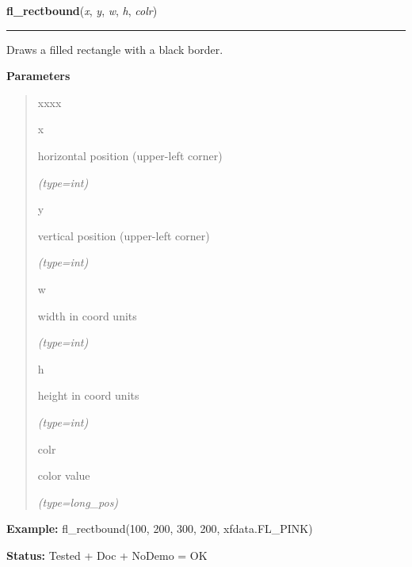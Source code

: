     \label{xformslib:flxbasic:fl_rectbound}

    \vspace{0.5ex}

\hspace{.8\funcindent}\begin{boxedminipage}{\funcwidth}

    \raggedright \textbf{fl\_rectbound}(\textit{x}, \textit{y}, \textit{w}, \textit{h}, \textit{colr})

    \vspace{-1.5ex}

    \rule{\textwidth}{0.5\fboxrule}
\setlength{\parskip}{2ex}
    Draws a filled rectangle with a black border.

\setlength{\parskip}{1ex}
      \textbf{Parameters}
      \vspace{-1ex}

      \begin{quote}
        \begin{Ventry}{xxxx}

          \item[x]

          horizontal position (upper-left corner)

            {\it (type=int)}

          \item[y]

          vertical position (upper-left corner)

            {\it (type=int)}

          \item[w]

          width in coord units

            {\it (type=int)}

          \item[h]

          height in coord units

            {\it (type=int)}

          \item[colr]

          color value

            {\it (type=long\_pos)}

        \end{Ventry}

      \end{quote}

\textbf{Example:} fl\_rectbound(100, 200, 300, 200, xfdata.FL\_PINK)



\textbf{Status:} Tested + Doc + NoDemo = OK



    \end{boxedminipage}


